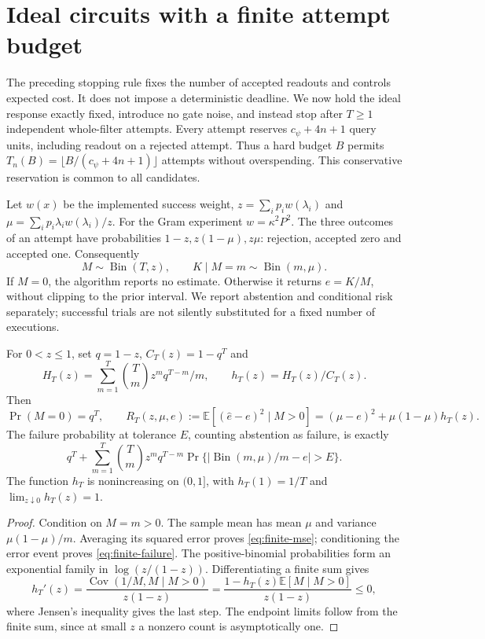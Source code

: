 \section{Ideal circuits with a finite attempt budget}\label{sec:finite}
The preceding stopping rule fixes the number of accepted readouts and
controls expected cost. It does not impose a deterministic deadline.
We now hold the ideal response exactly fixed, introduce no gate noise,
and instead stop after $T\geq1$ independent whole-filter attempts.
Every attempt reserves $c_\psi+4n+1$ query units, including readout on a
rejected attempt. Thus a hard budget $B$ permits
$T_n(B)=\lfloor B/(c_\psi+4n+1)\rfloor$ attempts without overspending.
This conservative reservation is common to all candidates.

Let $w(x)$ be the implemented success weight, $z=\sum_i p_iw(\lambda_i)$
and $\mu=\sum_i p_i\lambda_iw(\lambda_i)/z$.
For the Gram experiment $w=\kappa^2P^2$.
The three outcomes of an attempt have probabilities
$1-z,z(1-\mu),z\mu$: rejection, accepted zero and accepted one.
Consequently
\[
 M\sim\operatorname{Bin}(T,z),\qquad K\mid M=m\sim\operatorname{Bin}(m,\mu).
\]
If $M=0$, the algorithm reports no estimate. Otherwise it returns
$\widehat e=K/M$, without clipping to the prior interval.
We report abstention and conditional risk separately; successful trials
are not silently substituted for a fixed number of executions.

\begin{proposition}\label{prop:finite-law}
For $0<z\leq1$, set $q=1-z$, $C_T(z)=1-q^T$ and
\[
 H_T(z)=\sum_{m=1}^T\binom Tm z^m q^{T-m}/m,\qquad
 h_T(z)=H_T(z)/C_T(z).
\]
Then
\begin{equation}\label{eq:finite-mse}
 \Pr(M=0)=q^T,\qquad
 R_T(z,\mu,e):=\mathbb E[(\widehat e-e)^2\mid M>0]
 = (\mu-e)^2+\mu(1-\mu)h_T(z).
\end{equation}
The failure probability at tolerance $E$, counting abstention as failure,
is exactly
\begin{equation}\label{eq:finite-failure}
 q^T+\sum_{m=1}^T\binom Tm z^m q^{T-m}
 \Pr\{\lvert\operatorname{Bin}(m,\mu)/m-e\rvert>E\}.
\end{equation}
The function $h_T$ is nonincreasing on $(0,1]$, with
$h_T(1)=1/T$ and $\lim_{z\downarrow0}h_T(z)=1$.
\end{proposition}
\begin{proof}
Condition on $M=m>0$. The sample mean has mean $\mu$ and variance
$\mu(1-\mu)/m$. Averaging its squared error proves
\eqref{eq:finite-mse}; conditioning the error event proves
\eqref{eq:finite-failure}. The positive-binomial probabilities form an
exponential family in $\log(z/(1-z))$. Differentiating a finite sum gives
\[
 h_T'(z)=\frac{\operatorname{Cov}(1/M,M\mid M>0)}{z(1-z)}
 =\frac{1-h_T(z)\mathbb E[M\mid M>0]}{z(1-z)}\leq0,
\]
where Jensen's inequality gives the last step. The endpoint limits
follow from the finite sum, since at small $z$ a nonzero count is
asymptotically one.
\end{proof}

